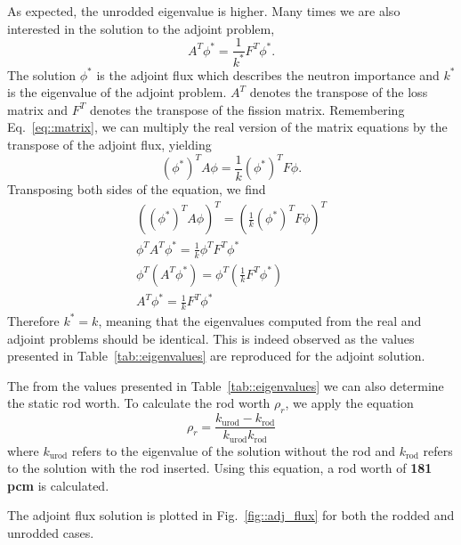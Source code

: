 \documentclass[12pt]{report}
\begin{document}
	As expected, the unrodded eigenvalue is higher. Many times we are also interested in the solution to the adjoint problem,
	\begin{equation}
	A^T \phi^* = \frac{1}{k^*} F^T \phi^*.
	\end{equation}
	The solution $\phi^*$ is the adjoint flux which describes the neutron importance and $k^*$ is the eigenvalue of the adjoint problem. $A^T$ denotes the transpose of the loss matrix and $F^T$ denotes the transpose of the fission matrix. Remembering Eq.~\ref{eq::matrix}, we can multiply the real version of the matrix equations by the transpose of the adjoint flux, yielding
	\begin{equation}
	\left(\phi^*\right)^T A \phi = \frac{1}{k} \left(\phi^*\right)^T F \phi.
	\end{equation}
	Transposing both sides of the equation, we find
	\begin{eqnarray}
	\left(\left(\phi^*\right)^T A \phi \right)^T= \left(\frac{1}{k} \left(\phi^*\right)^T F \phi \right)^T \\
	\phi^T A^T \phi^* = \frac{1}{k} \phi^T F^T \phi^* \\
	\phi^T \left(A^T \phi^* \right) = \phi^T \left(\frac{1}{k} F^T \phi^* \right) \\
	A^T \phi^* = \frac{1}{k} F^T \phi^*
	\end{eqnarray}
	Therefore $k^* = k$, meaning that the eigenvalues computed from the real and adjoint problems should be identical. This is indeed observed as the values presented in Table~\ref{tab::eigenvalues} are reproduced for the adjoint solution.
	
	The from the values presented in Table~\ref{tab::eigenvalues} we can also determine the static rod worth. To calculate the rod worth $\rho_r$, we apply the equation
	\begin{equation}
	\rho_r = \frac{k_\text{urod} - k_\text{rod}}{k_\text{urod} k_\text{rod}}
	\end{equation}
	where $k_\text{urod}$ refers to the eigenvalue of the solution without the rod and $k_\text{rod}$ refers to the solution with the rod inserted. Using this equation, a rod worth of \textbf{181 pcm} is calculated.
	
	The adjoint flux solution is plotted in Fig.~\ref{fig::adj_flux} for both the rodded and unrodded cases. 
	
\end{document}
